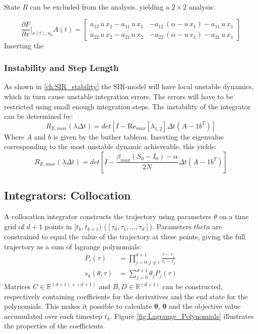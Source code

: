 State $R$ can be excluded from the analysis, yielding a $2\times 2$ analysis:

\begin{equation}
\frac{\partial F}{\partial x}|_{x(t),u_k} A(t) = 
\begin{bmatrix}
    a_{12}\,u\,x_{2}-a_{11}\,u\,x_{1} & -a_{12}\,\left(\alpha-u\,x_{1}\right)-a_{11}\,u\,x_{1}\\ a_{22}\,u\,x_{2}-a_{21}\,u\,x_{2} & -a_{22}\,\left(\alpha-u\,x_{1}\right)-a_{21}\,u\,x_{1} 
    \end{bmatrix}
\end{equation}
Inserting the 


\subsubsection{Instability and Step Length}
As shown in \ref{ch:SIR_stability} the SIR-model will have local unstable dynamics, which in turn cause unstable integration errors. The errors will have to be restricted using small enough integration steps. The instability of the integrator can be determined by:
\begin{equation}
    R_{E, max}(\lambda \Delta t) = det[I-\text{Re}_{max}[\lambda_{1,2}] \Delta t(A - 1b^T)]
\end{equation}
Where $A$ and $b$ is given by the buther tableau. Inserting the eigenvalue corresponding to the most unstable dynamic achieveable, this yields:
\begin{equation}
    R_{E, max}(\lambda \Delta t) = det[I- \frac{\beta_{max}(S_0-I_0) - \alpha}{2N} \Delta t(A - 1b^T)]
\end{equation}
\fi
\subsection{Integrators: Collocation}
A collocation integrator constructs the trajectory using
parameters $\theta$ on a time grid of $d+1$ points in $[t_k, t_{k+1})$ ($[\tau_0, \tau_1, \dots, \tau_d]$). Parameters $theta$ are constrained to equal the value of the trajectory at these points, giving the full trajectory as a sum of lagrange polynomials:
\begin{align}
    P_i(\tau) &= \prod_{j=0, j \neq i}^{d+1} \frac{\tau-\tau_j}{\tau_i - \tau_j}\\
    s_k(\theta, \tau) &= \sum_{j=0}^{d+1} \theta_j P_j(\tau)
\end{align}
Matrices $C \in \mathbb{R}^{(d+1)\times(d+1)}$ and $B, D \in \mathbb{R}^{(d+1)}$ can be constructed, respectively containing coefficients for the derivatives and the end state for the polynomials. This makes it possible to calculate $\bm{\theta}$, $\bm{\dot{\theta}}$ and the objective value accumulated over each timestep $t_k$. Figure \ref{fig:Lagrange_Polynomials} illustrates the properties of the coefficients.

